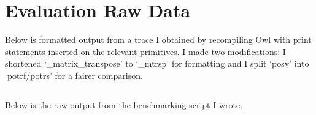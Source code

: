 \chapter{Evaluation Raw Data}\label{chap:eval_data}

Below is formatted output from a trace I obtained by recompiling Owl with print
statements inserted on the relevant primitives. I made two modifications: I
shortened `\_matrix\_transpose' to `\_mtrsp' for formatting and I split `posv'
into `potrf/potrs' for a fairer comparison.

\inputminted[linenos, fontsize=\small]{text}{trace.txt}

Below is the raw output from the benchmarking script I wrote.
\inputminted[linenos, fontsize=\small]{text}{timings.txt}

